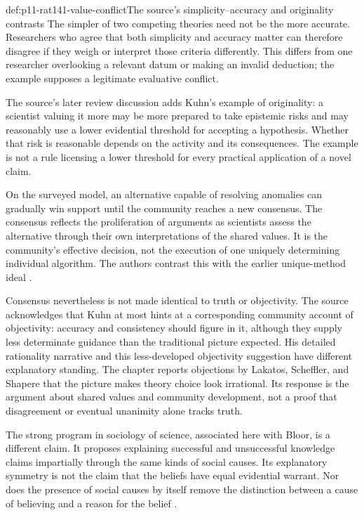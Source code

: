 \begin{hbexample}{def:p11-rat141-value-conflict}{The source's simplicity--accuracy and originality contrasts}
The simpler of two competing theories need not be the more accurate.
Researchers who agree that both simplicity and accuracy matter can
therefore disagree if they weigh or interpret those criteria differently.
This differs from one researcher overlooking a relevant datum or
making an invalid deduction; the example supposes a legitimate
evaluative conflict.

The source's later review discussion adds Kuhn's example of originality:
a scientist valuing it more may be more prepared to take epistemic
risks and may reasonably use a lower evidential threshold for accepting
a hypothesis. Whether that risk is reasonable depends on the activity
and its consequences. The example is not a rule licensing a lower
threshold for every practical application of a novel claim.
\end{hbexample}

On the surveyed model, an alternative capable of resolving anomalies
can gradually win support until the community reaches a new consensus.
The consensus reflects the proliferation of arguments as scientists
assess the alternative through their own interpretations of the shared
values. It is the community's effective decision, not the execution of
one uniquely determining individual algorithm. The authors contrast
this with the earlier unique-method ideal
\parencite[pp.~749--750 and p.~753]{AndersenAndersen2021Scientific}.

Consensus nevertheless is not made identical to truth or objectivity.
The source acknowledges that Kuhn at most hints at a corresponding
community account of objectivity: accuracy and consistency should
figure in it, although they supply less determinate guidance than the
traditional picture expected. His detailed rationality narrative and
this less-developed objectivity suggestion have different explanatory
standing. The chapter reports objections by Lakatos, Scheffler, and
Shapere that the picture makes theory choice look irrational. Its
response is the argument about shared values and community development,
not a proof that disagreement or eventual unanimity alone tracks truth.

The strong program in sociology of science, associated here with Bloor,
is a different claim. It proposes explaining successful and unsuccessful
knowledge claims impartially through the same kinds of social causes.
Its explanatory symmetry is not the claim that the beliefs have equal
evidential warrant. Nor does the presence of social causes by itself
remove the distinction between a cause of believing and a reason for
the belief \parencite[p.~750]{AndersenAndersen2021Scientific}.

